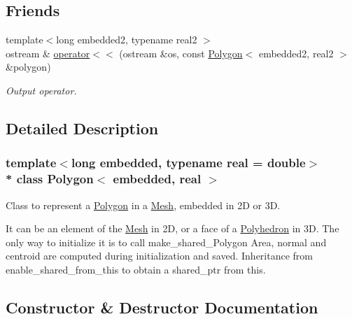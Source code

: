 \subsection*{Friends}
\begin{DoxyCompactItemize}
\item 
{\footnotesize template$<$long embedded2, typename real2 $>$ }\\ostream \& \hyperlink{class_polygon_a8261423e708f9f7c67f05e09fd5aff85}{operator$<$$<$} (ostream \&os, const \hyperlink{class_polygon}{Polygon}$<$ embedded2, real2 $>$ \&polygon)\hypertarget{class_polygon_a8261423e708f9f7c67f05e09fd5aff85}{}\label{class_polygon_a8261423e708f9f7c67f05e09fd5aff85}

\begin{DoxyCompactList}\small\item\em Output operator. \end{DoxyCompactList}\end{DoxyCompactItemize}


\subsection{Detailed Description}
\subsubsection*{template$<$long embedded, typename real = double$>$\\*
class Polygon$<$ embedded, real $>$}

Class to represent a \hyperlink{class_polygon}{Polygon} in a \hyperlink{class_mesh}{Mesh}, embedded in 2D or 3D. 

It can be an element of the \hyperlink{class_mesh}{Mesh} in 2D, or a face of a \hyperlink{class_polyhedron}{Polyhedron} in 3D. The only way to initialize it is to call make\+\_\+shared\+\_\+\+Polygon Area, normal and centroid are computed during initialization and saved. Inheritance from enable\+\_\+shared\+\_\+from\+\_\+this to obtain a shared\+\_\+ptr from this. 

\subsection{Constructor \& Destructor Documentation}
